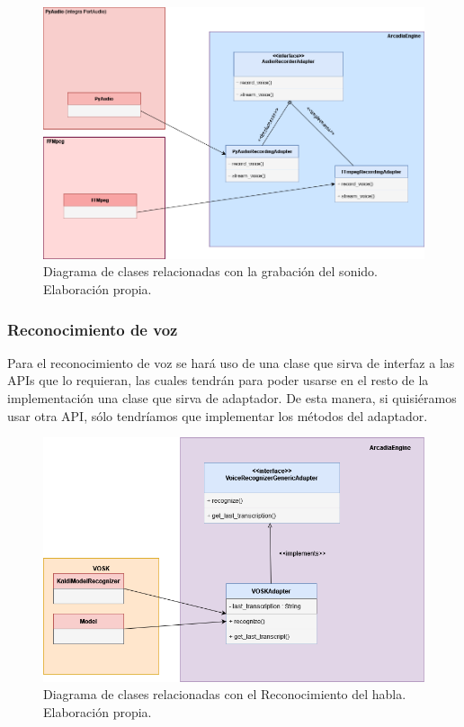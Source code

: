 \begin{figure}[H]
	\includegraphics[width=\textwidth]{imagenes/DiagramaClases_Grabacion.png}
	\caption{Diagrama de clases relacionadas con la grabación del sonido. Elaboración propia.}
\end{figure}

\subsubsection{Reconocimiento de voz}
Para el reconocimiento de voz se hará uso de una clase que sirva de interfaz a las APIs que lo requieran, las cuales tendrán para poder usarse en el resto de la implementación una clase que sirva de adaptador. De esta manera, si quisiéramos usar otra API, sólo tendríamos que implementar los métodos del adaptador.
\begin{figure}[H]
	\includegraphics[width=\textwidth]{imagenes/DiagramaClases_SR.png}
	\caption{Diagrama de clases relacionadas con el Reconocimiento del habla. Elaboración propia.}
\end{figure}
